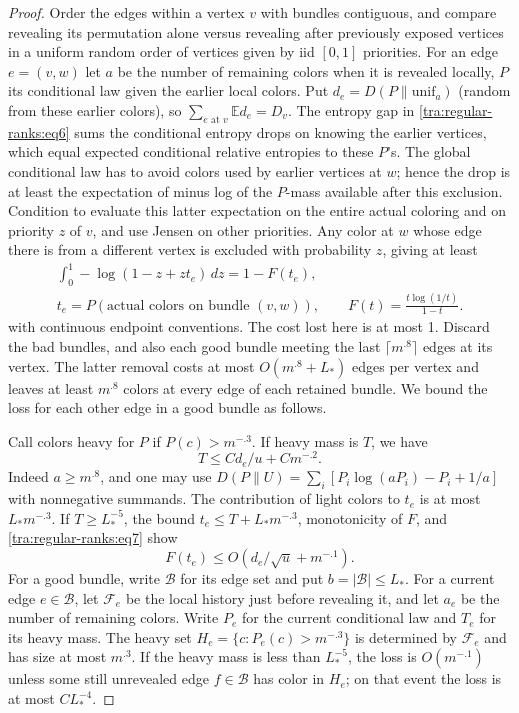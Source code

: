 \begin{proof}
Order the edges within a vertex \(v\) with bundles contiguous, and compare revealing its permutation alone versus revealing after previously exposed vertices in a uniform random order of vertices given by iid \([0,1]\) priorities. For an edge \(e=(v,w)\) let \(a\) be the number of remaining colors when it is revealed locally, \(P\) its conditional law given the earlier local colors. Put \(d_e=D(P\|\mathrm{unif}_a)\) (random from these earlier colors), so \(\sum_{e\text{ at }v}\mathbb E d_e=D_v\). The entropy gap in \eqref{tra:regular-ranks:eq6} sums the conditional entropy drops on knowing the earlier vertices, which equal expected conditional relative entropies to these \(P\)'s. The global conditional law has to avoid colors used by earlier vertices at \(w\); hence the drop is at least the expectation of minus log of the \(P\)-mass available after this exclusion. Condition to evaluate this latter expectation on the entire actual coloring and on priority \(z\) of \(v\), and use Jensen on other priorities. Any color at \(w\) whose edge there is from a different vertex is excluded with probability \(z\), giving at least
\[
\begin{gathered}
\int_0^1 -\log(1-z+z t_e)\,dz=1-F(t_e),\\
t_e=P(\text{actual colors on bundle }(v,w)),
\qquad F(t)=\frac{t\log(1/t)}{1-t}.
\end{gathered}
\]
with continuous endpoint conventions. The cost lost here is at most 1. Discard the bad bundles, and also each good bundle meeting the last $\lceil m^{.8}\rceil$ edges at its vertex. The latter removal costs at most $O(m^{.8}+L_*)$ edges per vertex and leaves at least $m^{.8}$ colors at every edge of each retained bundle. We bound the loss for each other edge in a good bundle as follows.

Call colors heavy for \(P\) if \(P(c)>m^{-.3}\). If heavy mass is \(T\), we have
\begin{equation}
                     T\le C d_e/u+C m^{-.2}.\label{tra:regular-ranks:eq7}
\end{equation}
Indeed \(a\ge m^{.8}\), and one may use
\(D(P\|U)=\sum_i[P_i\log(aP_i)-P_i+1/a]\) with nonnegative summands. The contribution of light colors to \(t_e\) is at most \(L_*m^{-.3}\). If \(T\ge L_*^{-5}\), the bound \(t_e\le T+L_*m^{-.3}\), monotonicity of \(F\), and \eqref{tra:regular-ranks:eq7} show
\begin{equation}
                           F(t_e)\le O(d_e/\sqrt u + m^{-.1}).\label{tra:regular-ranks:eq8}
\end{equation}
For a good bundle, write $\mathcal B$ for its edge set and put
$b=|\mathcal B|\le L_*$. For a current edge $e\in\mathcal B$,
let $\mathcal F_e$ be the local history just before revealing it,
and let $a_e$ be the number of remaining colors. Write $P_e$ for
the current conditional law and $T_e$ for its heavy mass. The heavy set
$H_e=\{c:P_e(c)>m^{-.3}\}$ is determined by $\mathcal F_e$ and
has size at most $m^{.3}$. If the heavy mass is less than $L_*^{-5}$,
the loss is $O(m^{-.1})$ unless some still unrevealed edge
$f\in\mathcal B$ has color in $H_e$; on that event the loss is
at most $C L_*^{-4}$.


\end{proof}
